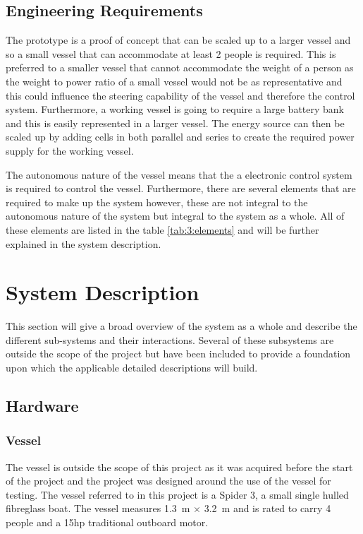 	\subsection{Engineering Requirements}
	The prototype is a proof of concept that can be scaled up to a larger vessel and so a small vessel that can accommodate at least 2 people is required. This is preferred to a smaller vessel that cannot accommodate the weight of a person as the weight to power ratio of a small vessel would not be as representative and this could influence the steering capability of the vessel and therefore the control system.
	Furthermore, a working vessel is going to require a large battery bank and this is easily represented in a larger vessel. The energy source can then be scaled up by adding cells in both parallel and series to create the required power supply for the working vessel.\par
	The autonomous nature of the vessel means that the a electronic control system is required to control the vessel. Furthermore, there are several elements that are required to make up the system however, these are not integral to the autonomous nature of the system but integral to the system as a whole. All of these elements are listed in the table \ref{tab:3:elements} and will be further explained in the system description.\par
\section{System Description}
This section will give a broad overview of the system as a whole and describe the different sub-systems and their interactions. Several of these subsystems are outside the scope of the project but have been included to provide a foundation upon which the applicable detailed descriptions will build. \par
	\subsection{Hardware}\par
		\subsubsection{Vessel}
		The vessel is outside the scope of this project as it was acquired before the start of the project and the project was designed around the use of the vessel for testing. The vessel referred to in this project is a Spider 3, a small single hulled fibreglass boat. The vessel measures \SI{1.3}{\meter} $\times$ \SI{3.2}{\meter} and is rated to carry 4 people and a 15hp traditional outboard motor.\par
